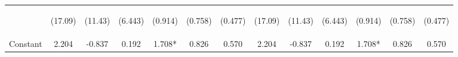 \documentclass[]{article}
\begin{document}
\begin{center}
\begin{tabular}{lcccccccccccc}
\vspace{4pt} & \begin{footnotesize}(17.09)\end{footnotesize} & \begin{footnotesize}(11.43)\end{footnotesize} & \begin{footnotesize}(6.443)\end{footnotesize} & \begin{footnotesize}(0.914)\end{footnotesize} & \begin{footnotesize}(0.758)\end{footnotesize} & \begin{footnotesize}(0.477)\end{footnotesize} & \begin{footnotesize}(17.09)\end{footnotesize} & \begin{footnotesize}(11.43)\end{footnotesize} & \begin{footnotesize}(6.443)\end{footnotesize} & \begin{footnotesize}(0.914)\end{footnotesize} & \begin{footnotesize}(0.758)\end{footnotesize} & \begin{footnotesize}(0.477)\end{footnotesize} \\
Constant & 2.204 & -0.837 & 0.192 & 1.708* & 0.826 & 0.570 & 2.204 & -0.837 & 0.192 & 1.708* & 0.826 & 0.570 \\

\end{tabular}
\end{center}
\end{document}
